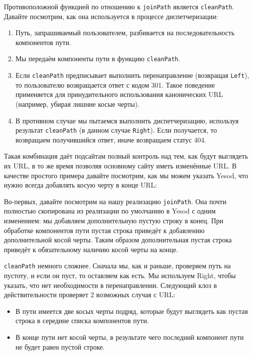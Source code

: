 Противоположной функцией по отношению к \lstinline!joinPath! является
\lstinline!cleanPath!. Давайте посмотрим, как она используется в процессе
диспетчеризации:

\begin{enumerate}
  \item Путь, запрашиваемый пользователем, разбивается на последовательность
      компонентов пути.

  \item Мы передаём компоненты пути в функцию \lstinline!cleanPath!.

  \item Если \lstinline!cleanPath! предписывает выполнить перенаправление
      (возвращая \lstinline!Left!), то пользователю возвращается ответ с кодом
      301. Такое поведение применяется для принудительного использования
      канонических URL (например, убирая лишние косые черты).

  \item В противном случае мы пытаемся выполнить диспетчеризацию, используя
      результат \lstinline!cleanPath! (в данном случае \lstinline!Right!). Если
      получается, то возвращаем получившийся ответ, иначе возвращаем статус
      404.
\end{enumerate}

Такая комбинация даёт подсайтам полный контроль над тем, как будут выглядеть их
URL, в то же время позволяя основному сайту иметь изменённые URL. В качестве
простого примера давайте посмотрим, как мы можем указать Yesod, что нужно
всегда добавлять косую черту в конце URL:

Во-первых, давайте посмотрим на нашу реализацию \lstinline!joinPath!. Она почти
полностью скопирована из реализации по умолчанию в Yesod с одним изменением: мы
добавляем дополнительную пустую строку в конец. При обработке компонентов пути
пустая строка приведёт к добавлению дополнительной косой черты. Таким образом
дополнительная пустая строка приведёт к обязательному наличию косой черты на
конце.

\lstinline!cleanPath! немного сложнее. Сначала мы, как и раньше, проверяем путь
на пустоту, и если он пуст, то оставляем как есть. Мы используем Right, чтобы
указать, что нет необходимости в перенаправлении. Следующий клоз в
действительности проверяет 2 возможных случая с URL:

\begin{itemize}
  \item В пути имеется две косых черты подряд, которые будут выглядеть как
      пустая строка в середине списка компонентов пути.

  \item В конце пути нет косой черты, в результате чего последний компонент
      пути не будет равен пустой строке.
\end{itemize}

